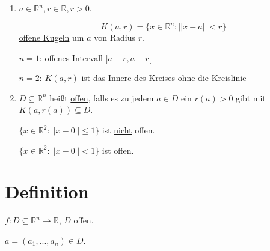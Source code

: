 \documentclass[a4paper, openany]{book}
\begin{document}
          \begin{enumerate}[label=(\alph*))]

            \item   $a \in \mathbb{R}^n, r \in \mathbb{R}, r > 0$.

            \[ K(a,r) = \{ x \in \mathbb{R}^n : ||x-a|| < r \} \] \underline{offene Kugeln} um $a$ von Radius $r$.

            \par \medskip

            $n = 1$: offenes Intervall $]a-r, a+r[$

            \par \medskip

            $n = 2$: $K(a,r)$ ist das Innere des Kreises ohne die Kreislinie

            \item $D \subseteq \mathbb{R}^n$ heißt \underline{offen}, falls es zu jedem $a \in D$ ein $r(a) > 0$ gibt mit $K(a, r(a)) \subseteq D$.

            \par \medskip

            $\{x \in \mathbb{R}^2 : || x-0|| \le 1 \}$ ist \underline{nicht} offen.

            \par \medskip

            $\{x \in \mathbb{R}^2 : || x-0 || < 1 \}$ ist offen.

          \end{enumerate}


          \section{Definition}

          $f : D \subseteq \mathbb{R}^n \rightarrow \mathbb{R}$, $D$ offen.

          \par \medskip

          $a = (a_1, ..., a_n) \in D$.
\end{document}
